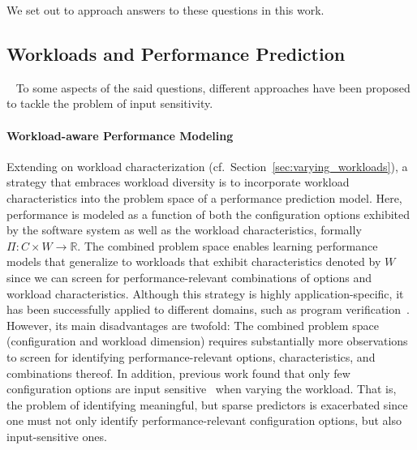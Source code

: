 {{We set out to approach answers to these questions in this work.
}
	
\subsection{Workloads and Performance Prediction} ~\label{sec:strategies}
To some aspects of the said questions, different approaches have been proposed to tackle the problem of input sensitivity.

\paragraph{Workload-aware Performance Modeling}\label{sec:workload-aware}
Extending on workload characterization (cf.~Section~\ref{sec:varying_workloads}), a strategy that embraces workload diversity is to incorporate workload characteristics into the problem space of a performance prediction model. Here, performance is modeled as a function of both the configuration options exhibited by the software system as well as the workload characteristics, formally $\Pi: C \times W \rightarrow \mathbb{R}$.
The combined problem space enables learning performance models that generalize to workloads that exhibit characteristics denoted by $W$ since we can screen for performance-relevant combinations of options and workload characteristics. Although this strategy is highly application-specific, it has been successfully applied to different domains, such as program verification~\cite{koc_satune_2021}. However, its main disadvantages are twofold: The combined problem space (configuration and workload dimension) requires substantially more observations to screen for identifying performance-relevant options, characteristics, and combinations thereof. In addition, previous work  found that  only few configuration options are input sensitive~\cite{jamishidi_transfer_2017} when varying the workload. That is, the problem of identifying meaningful, but sparse predictors is exacerbated since one must not only identify performance-relevant configuration options, but also input-sensitive ones.

}
